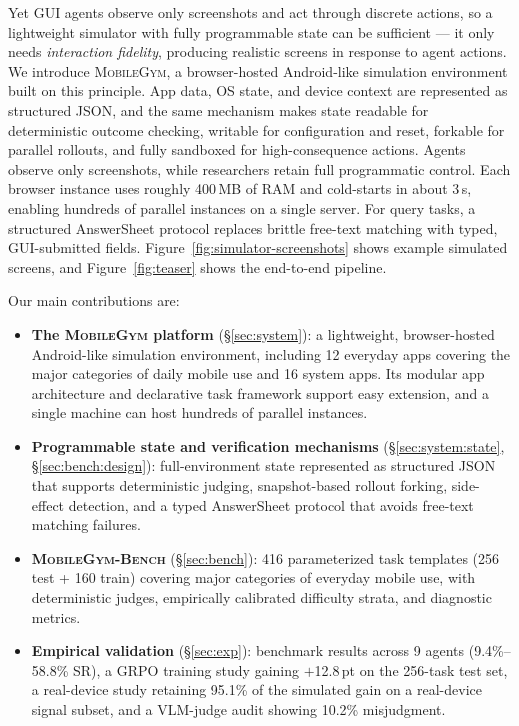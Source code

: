 \documentclass[11pt]{article}
\newcommand{\sys}{\textsc{MobileGym}}
\newcommand{\bench}{\textsc{MobileGym-Bench}}
\begin{document}
Yet GUI agents observe only screenshots and act through discrete actions, so a lightweight simulator with fully programmable state can be sufficient --- it only needs \emph{interaction fidelity}, producing realistic screens in response to agent actions. We introduce \sys{}, a browser-hosted Android-like simulation environment built on this principle. App data, OS state, and device context are represented as structured JSON, and the same mechanism makes state readable for deterministic outcome checking, writable for configuration and reset, forkable for parallel rollouts, and fully sandboxed for high-consequence actions. Agents observe only screenshots, while researchers retain full programmatic control. Each browser instance uses roughly 400\,MB of RAM and cold-starts in about 3\,s, enabling hundreds of parallel instances on a single server. For query tasks, a structured AnswerSheet protocol replaces brittle free-text matching with typed, GUI-submitted fields. Figure~\ref{fig:simulator-screenshots} shows example simulated screens, and Figure~\ref{fig:teaser} shows the end-to-end pipeline.

Our main contributions are:

\begin{itemize}
  \item \textbf{The \sys{} platform} (§\ref{sec:system}): a lightweight, browser-hosted Android-like simulation environment, including 12 everyday apps covering the major categories of daily mobile use and 16 system apps. Its modular app architecture and declarative task framework support easy extension, and a single machine can host hundreds of parallel instances.

  \item \textbf{Programmable state and verification mechanisms} (§\ref{sec:system:state}, §\ref{sec:bench:design}): full-environment state represented as structured JSON that supports deterministic judging, snapshot-based rollout forking, side-effect detection, and a typed AnswerSheet protocol that avoids free-text matching failures.

  \item \textbf{\bench{}} (§\ref{sec:bench}): 416 parameterized task templates (256 test + 160 train) covering major categories of everyday mobile use, with deterministic judges, empirically calibrated difficulty strata, and diagnostic metrics.

  \item \textbf{Empirical validation} (§\ref{sec:exp}): benchmark results across 9 agents (9.4\%--58.8\% SR), a GRPO training study gaining $+$12.8\,pt on the 256-task test set, a real-device study retaining 95.1\% of the simulated gain on a real-device signal subset, and a VLM-judge audit showing 10.2\% misjudgment.
\end{itemize}
\end{document}
